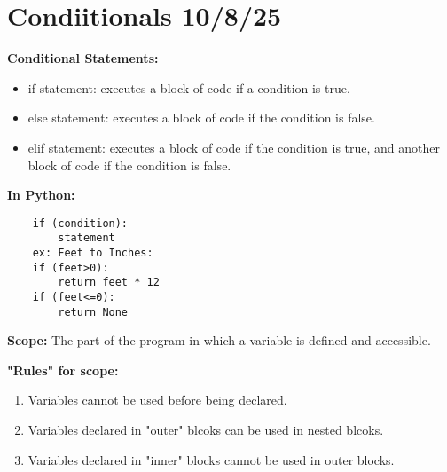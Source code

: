\documentclass[11pt]{article}
\begin{document}
\section{Condiitionals 10/8/25}
\textbf{Conditional Statements:}
\begin{itemize}
    \item if statement: executes a block of code if a condition is true.
    \item else statement: executes a block of code if the condition is false.
    \item elif statement: executes a block of code if the condition is true, and another block of code if the condition is false.
\end{itemize}
\textbf{In Python:}
\begin{verbatim}
    if (condition):
        statement
    ex: Feet to Inches:
    if (feet>0):
        return feet * 12
    if (feet<=0):
        return None
\end{verbatim}
\textbf{Scope:} The part of the program in which a variable is defined and accessible. 
\begin{center}
\textbf{"Rules" for scope:}
\end{center}
\begin{enumerate}
    \item Variables cannot be used before being declared.
    \item Variables declared in "outer" blcoks can be used in nested blcoks.
    \item Variables declared in "inner" blocks cannot be used in outer blocks.
\end{enumerate}
\end{document}
